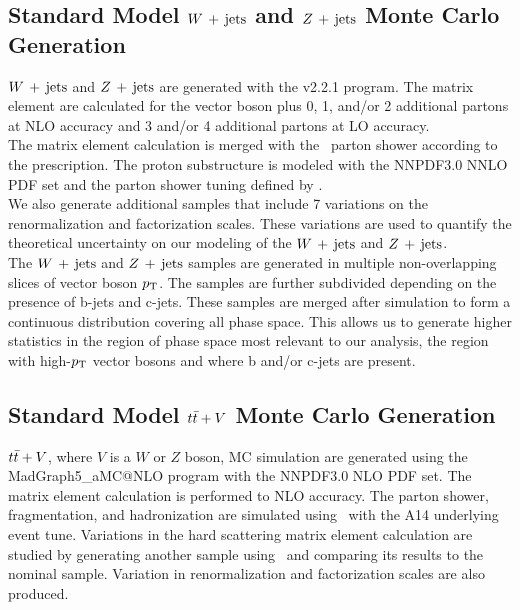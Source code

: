 \subsection{Standard Model $W\,+\,\mathrm{jets}$ and $Z\,+\,\mathrm{jets}$ Monte Carlo Generation}

\indent $W\,+\,\mathrm{jets}$ and $Z\,+\,\mathrm{jets}$ are generated with the \sherpa v2.2.1 program.\cite{sherpa}  The matrix element are calculated for the vector boson plus 0, 1, and/or 2 additional partons at NLO accuracy and 3 and/or 4 additional partons at LO accuracy.  \\

\indent The matrix element calculation is merged with the \sherpa\ parton shower according to the  prescription.  The proton substructure is modeled with the NNPDF3.0 NNLO PDF set and the parton shower tuning defined by \sherpa.\cite{NNPDF3.0}   \\

\indent  We also generate additional samples that include 7 variations on the renormalization and factorization scales.  These variations are used to quantify the theoretical uncertainty on our modeling of the $W\,+\,\mathrm{jets}$ and $Z\,+\,\mathrm{jets}$. \\

\indent  The $W\,+\,\mathrm{jets}$ and $Z\,+\,\mathrm{jets}$ samples are generated in multiple non-overlapping slices of vector boson $p_{\mathrm{T}}$.  The samples are further subdivided depending on the presence of b-jets and c-jets.  These samples are merged after simulation to form a continuous distribution covering all phase space.  This allows us to generate higher statistics in the region of phase space most relevant to our analysis, the region with high-$p_{\mathrm{T}}$ vector bosons and where b and/or c-jets are present. \\

\subsection{Standard Model $t\bar{t}+V$ Monte Carlo Generation}

\indent $t\bar{t}+V$, where $V$ is a $W$ or $Z$ boson, MC simulation are generated using the {\sc MadGraph5\_aMC\/@NLO} program with the NNPDF3.0 NLO PDF set.\cite{NNPDF3.0}  The matrix element calculation is performed to NLO accuracy. The parton shower, fragmentation, and hadronization are simulated using \pythiaeight\ with the A14 underlying event tune.  Variations in the hard scattering matrix element calculation are studied by generating another sample using \sherpa\ and comparing its results to the nominal sample.  Variation in renormalization and factorization scales are also produced. \\

